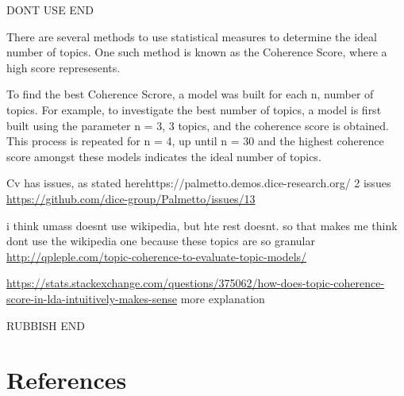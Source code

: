 \documentclass[
]{article}
\begin{document}
DONT USE END

There are several methods to use statistical measures to determine the
ideal number of topics. One such method is known as the Coherence Score,
where a high score represesents.

To find the best Coherence Scrore, a model was built for each n, number
of topics. For example, to investigate the best number of topics, a
model is first built using the parameter n = 3, 3 topics, and the
coherence score is obtained. This process is repeated for n = 4, up
until n = 30 and the highest coherence score amongst these models
indicates the ideal number of topics.

Cv has issues, as stated herehttps://palmetto.demos.dice-research.org/ 2
issues \url{https://github.com/dice-group/Palmetto/issues/13}

i think umass doesnt use wikipedia, but hte rest doesnt. so that makes
me think dont use the wikipedia one because these topics are so granular
\url{http://qpleple.com/topic-coherence-to-evaluate-topic-models/}

\url{https://stats.stackexchange.com/questions/375062/how-does-topic-coherence-score-in-lda-intuitively-makes-sense}
more explanation

RUBBISH END

\hypertarget{references}{%
\section{References}\label{references}}
\end{document}
